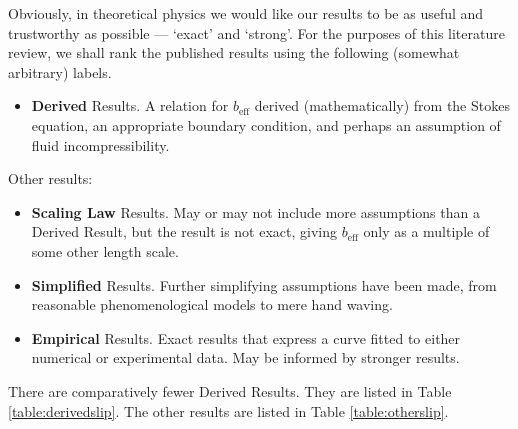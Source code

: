 \documentclass[12pt, a4paper, twoside, openright]{book}
\newcommand{\beff}{\ensuremath{b_{\mathrm{eff}}}}
\begin{document}
Obviously, in theoretical physics we would like our results to be as useful and trustworthy as possible --- `exact' and `strong'.  For the purposes of this literature review, we shall rank the published results using the following (somewhat arbitrary) labels.

\begin{itemize}

\item \textbf{Derived} Results.  A relation for $\beff$ derived (mathematically) from the Stokes equation, an appropriate boundary condition, and perhaps an assumption of fluid incompressibility.

\end{itemize}

Other results:

\begin{itemize}

\item \textbf{Scaling Law} Results.  May or may not include more assumptions than a Derived Result, but the result is not exact, giving $\beff$ only as a multiple of some other length scale.

\item \textbf{Simplified} Results.  Further simplifying assumptions have been made, from reasonable phenomenological models to mere hand waving.

\item \textbf{Empirical} Results.  Exact results that express a curve fitted to either numerical or experimental data.  May be informed by stronger results.

\end{itemize}


There are comparatively fewer Derived Results.  They are listed in Table \ref{table:derivedslip}.  The other results are listed in Table \ref{table:otherslip}.
\end{document}
